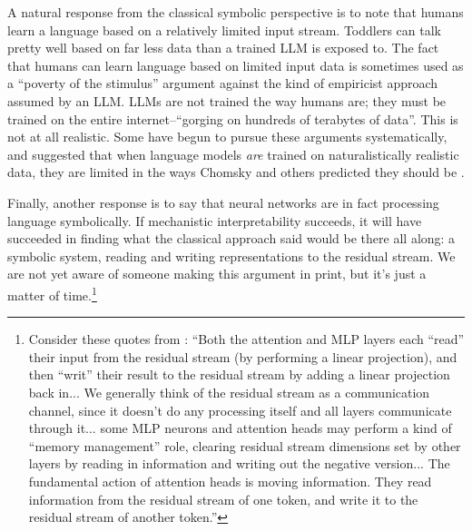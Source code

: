 A natural response from the classical symbolic perspective is to note that
humans learn a language based on a relatively limited input stream. Toddlers
can talk pretty well based on  far less data than a trained LLM is exposed to.
The fact that humans can learn language based on limited input data is
sometimes used as a ``poverty of the stimulus'' argument against the kind of
empiricist approach assumed by an LLM.  LLMs are not trained the way humans
are; they must be trained on the entire internet--``gorging on hundreds of
terabytes of data''.  This is not at all realistic. Some have begun to pursue
these arguments systematically, and suggested that when language models
\emph{are} trained on naturalistically realistic data, they are limited in the
ways Chomsky and others predicted they should be \cite{lan2024large}.

Finally, another response is to say that neural networks are in fact processing
language symbolically. If mechanistic interpretability succeeds, it will have
succeeded in finding what the classical approach said would be there all along:
a  symbolic system, reading and writing representations to the residual stream.
We are not yet aware of someone making this argument in print, but it's just a
matter of time.\footnote{Consider these quotes from
\cite{elhage2021mathematical}: ``Both the attention and MLP layers each
``read'' their input from the residual stream (by performing a linear
projection), and then ``writ'' their result to the residual stream by adding a
linear projection back in... We generally think of the residual stream as a
communication channel, since it doesn't do any processing itself and all layers
communicate through it... some MLP neurons and attention heads may perform a
kind of ``memory management'' role, clearing residual stream dimensions set by
other layers by reading in information and writing out the negative version...
The fundamental action of attention heads is moving information. They read
information from the residual stream of one token, and write it to the residual
stream of another token.''}

